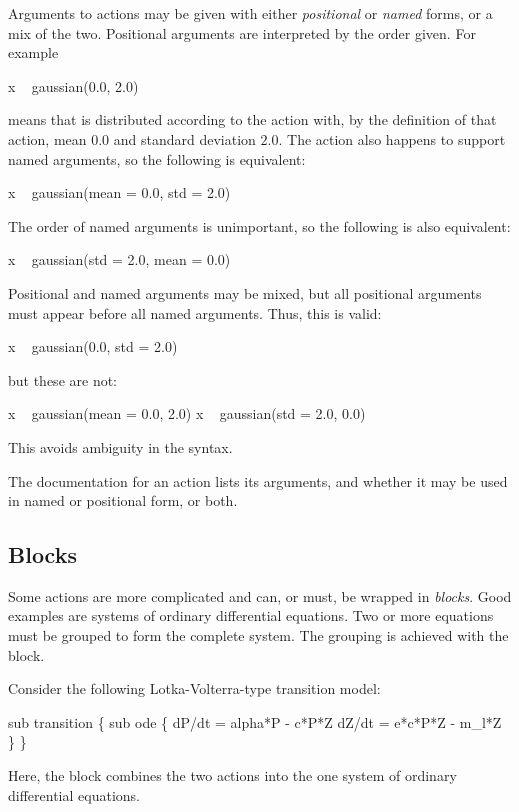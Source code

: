 Arguments to actions may be given with either \emph{positional}
 or \emph{named} forms,
or a mix of the two. Positional arguments are interpreted by the order
given. For example
\begin{bicode}
x ~ gaussian(0.0, 2.0)
\end{bicode}
means that  is distributed according to the 
action with, by the definition of that action, mean $0.0$ and standard
deviation $2.0$. The  action also happens to support named
arguments, so the following is equivalent:
\begin{bicode}
x ~ gaussian(mean = 0.0, std = 2.0)
\end{bicode}
The order of named arguments is unimportant, so the following is also
equivalent:
\begin{bicode}
x ~ gaussian(std = 2.0, mean = 0.0)
\end{bicode}

Positional and named arguments may be mixed, but all positional arguments must
appear before all named arguments. Thus, this is valid:
\begin{bicode}
x ~ gaussian(0.0, std = 2.0)
\end{bicode}
but these are not:
\begin{bicode}
x ~ gaussian(mean = 0.0, 2.0)
x ~ gaussian(std = 2.0, 0.0)
\end{bicode}
This avoids ambiguity in the syntax.

The documentation for an action lists its arguments, and whether it may be
used in named or positional form, or both.

\subsection{Blocks}

Some actions are more complicated and can, or must, be wrapped in
\emph{blocks}. Good examples are systems of ordinary differential
equations. Two or more equations must
be grouped to form the complete system. The grouping is achieved with the
 block.

Consider the following Lotka-Volterra-type transition
model:
\begin{bicode}
sub transition \{
  sub ode \{
    dP/dt = alpha*P - c*P*Z
    dZ/dt = e*c*P*Z - m_l*Z
  \}
\}
\end{bicode}
Here, the  block combines the two actions into the one system of
ordinary differential equations.

